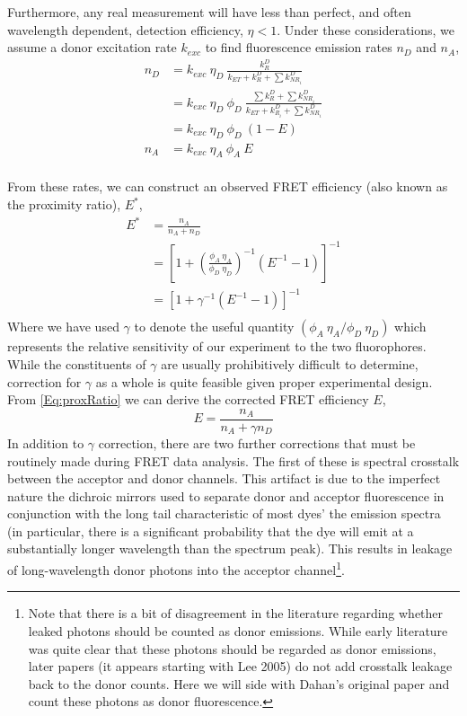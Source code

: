 \documentclass{article}
\newcommand{\NR}{\ensuremath{\mathit{NR}}}          %
\newcommand{\ET}{\ensuremath{\mathit{ET}}}          %
\begin{document}
Furthermore, any real measurement will have less than perfect, and
often wavelength dependent, detection efficiency, $\eta < 1$.  Under
these considerations, we assume a donor excitation rate $k_{exc}$ to
find fluorescence emission rates $n_D$ and $n_A$,
\begin{align*}
  n_D & = k_{exc} ~ \eta_D ~ \frac{k^D_R}{k_\ET + k^D_R + \sum k^D_{\NR_i}} \\
      & = k_{exc} ~ \eta_D ~ \phi_D ~
         \frac{\sum k^D_R + \sum k^D_{\NR_i}}{k_\ET + k^D_{R_i} + \sum k^D_{\NR_i}} \\
      & = k_{exc} ~ \eta_D ~ \phi_D ~ (1 - E) \\
  n_A & = k_{exc} ~ \eta_A ~ \phi_A ~ E \\
\end{align*}

From these rates, we can construct an observed FRET efficiency (also
known as the proximity ratio), $E^*$,
\begin{align*}
  E^* & = \frac{n_A}{n_A + n_D} \\
      & = \left[ 1 + \left(\frac{\phi_A~\eta_A}{\phi_D~\eta_D}\right)^{-1} (E^{-1} - 1) \right]^{-1} \\
      & = \left[ 1 + \gamma^{-1} (E^{-1} - 1) \right]^{-1} \label{Eq:proxRatio} \\
\end{align*}
Where we have used $\gamma$ to denote the useful quantity $(\phi_A~\eta_A / \phi_D~\eta_D)$
which represents the relative sensitivity of our experiment to the two
fluorophores. While the constituents of $\gamma$ are usually
prohibitively difficult to determine, correction for $\gamma$ as a
whole is quite feasible given proper experimental design. From
\eqref{Eq:proxRatio} we can derive the corrected FRET efficiency $E$,
\begin{equation}
  E = \frac{n_A}{n_A + \gamma n_D}
  \label{Eq:gammaFretEff}
\end{equation}
In addition to $\gamma$ correction, there are two further corrections that
must be routinely made during FRET data analysis. The first of these
is spectral crosstalk between the acceptor and donor channels. This
artifact is due to the imperfect nature the dichroic mirrors
used to separate donor and acceptor fluorescence in conjunction with
the long tail characteristic of most dyes' the emission spectra (in
particular, there is a significant probability that the dye will emit
at a substantially longer wavelength than the spectrum peak).  This
results in leakage of long-wavelength donor photons into the acceptor
channel\footnote{Note that there is a bit of disagreement in the
literature regarding whether leaked photons should be counted as donor
emissions. While early literature\cite{Dahan2005,Taylor2010} was quite
clear that these photons should be regarded as donor emissions, later
papers (it appears starting with Lee 2005\cite{Lee2005}) do not add
crosstalk leakage back to the donor counts. Here we will side with
Dahan's original paper and count these photons as donor fluorescence.}.
\end{document}
